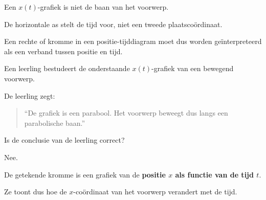 \documentclass{ximera}
\begin{document}
\begin{opmerking}

Een $x(t)$-grafiek is niet de baan van het voorwerp.

De horizontale as stelt de tijd voor, niet een tweede
plaatscoördinaat.

\end{opmerking}

Een rechte of kromme in een positie-tijddiagram moet dus worden
geïnterpreteerd als een verband tussen positie en tijd.


\begin{oefening}{\oefU\ESS}

  Een leerling bestudeert de onderstaande $x(t)$-grafiek van een bewegend
  voorwerp.
  
  \begin{center}
  \end{center}
  
  De leerling zegt:
  
  \begin{quote}
  ``De grafiek is een parabool. Het voorwerp beweegt dus langs een
  parabolische baan.''
  \end{quote}
  
  
  \begin{question}
  Is de conclusie van de leerling correct?
  
  \begin{oplossing}
  Nee.
  
  De getekende kromme is een grafiek van de \textbf{positie $x$ als functie
  van de tijd $t$}.
  
  Ze toont dus hoe de $x$-coördinaat van het voorwerp verandert met de tijd.
  

\end{oplossing}
\end{question}
\end{oefening}
\end{document}
